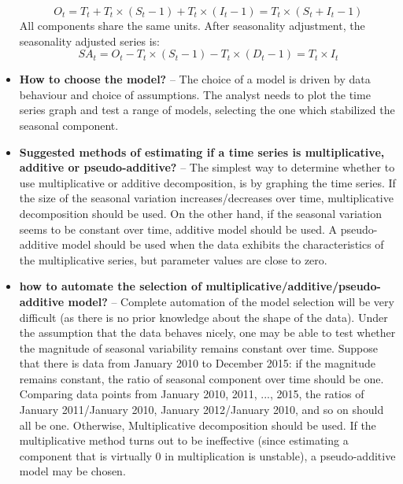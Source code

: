 \begin{itemize}[noitemsep]
    \begin{equation*}
       O_t = T_t + T_t \times (S_t-1) + T_t \times (I_t -1)=T_t \times (S_t +I_t -1)  
    \end{equation*}
    All components share the same units. After seasonality adjustment, the seasonality adjusted series is:
    \begin{equation*}
        SA_t = O_t - T_t \times (S_t -1 )-T_t \times (D_t -1) = T_t \times I_t
    \end{equation*}
    \item \textbf{How to choose the model?} -- The choice of a model is driven by data behaviour and choice of assumptions. The analyst needs to plot the time series graph and test a range of models, selecting the one which stabilized the seasonal component.
    \item \textbf{Suggested methods of estimating if a time series is multiplicative, additive or pseudo-additive?} -- The simplest way to determine whether to use multiplicative or additive decomposition, is by graphing the time series. If the size of the seasonal variation increases/decreases over time, multiplicative decomposition should be used. On the other hand, if the seasonal variation seems to be constant over time, additive model should be used. A pseudo-additive model should be used when the data exhibits the characteristics of the multiplicative series, but parameter values are close to zero.
    \item \textbf{how to automate the selection of multiplicative/additive/pseudo-additive model?} -- Complete automation of the model selection will be very difficult (as there is no prior knowledge about the shape of the data). Under the assumption that the data behaves nicely, one may be able to test whether the magnitude of seasonal variability remains constant over time. Suppose that there is data from January 2010 to December 2015: if the magnitude remains constant, the ratio of seasonal component over time should be one. Comparing data points from January 2010, 2011, ..., 2015, the ratios of January 2011/January 2010, January 2012/January 2010, and so on should all be one. Otherwise, Multiplicative decomposition should be used. If the multiplicative method turns out to be ineffective (since estimating a component that is virtually 0 in multiplication is unstable), a pseudo-additive model may be chosen.
    
    
\end{itemize}



